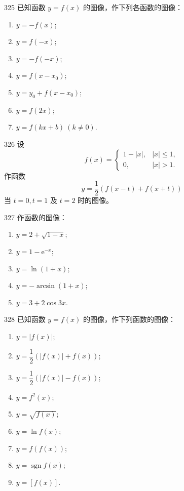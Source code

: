 \begin{prob}[L]{325}
已知函数 $y = f(x)$ 的图像，作下列各函数的图像：
\begin{enumerate}[label=(\alph*), itemsep=2pt, topsep=3pt]
  \item $y = -f(x)$;
  \item $y = f(-x)$;
  \item $y = -f(-x)$;
  \item $y = f(x - x_0)$;
  \item $y = y_0 + f(x - x_0)$;
  \item $y = f(2x)$;
  \item $y = f(kx + b) \ (k \neq 0)$.
\end{enumerate}
\end{prob}

\begin{prob}[M]{326}
设
\[
f(x) = \begin{cases}
1 - |x|, & |x| \leqslant 1, \\
0, & |x| > 1.
\end{cases}
\]
作函数
\[
y = \frac{1}{2}(f(x - t) + f(x + t))
\]
当 $t = 0, t = 1$ 及 $t = 2$ 时的图像。
\end{prob}

\begin{prob}[L]{327}
作函数的图像：
\begin{enumerate}[label=(\alph*), itemsep=2pt, topsep=3pt]
  \item $y = 2 + \sqrt{1 - x}$;
  \item $y = 1 - \mathrm{e}^{-x}$;
  \item $y = \ln(1 + x)$;
  \item $y = -\arcsin(1 + x)$;
  \item $y = 3 + 2\cos 3x$.
\end{enumerate}
\end{prob}

\begin{prob}[L]{328}
已知函数 $y = f(x)$ 的图像，作下列函数的图像：
\begin{enumerate}[label=(\alph*), itemsep=2pt, topsep=3pt]
  \item $y = |f(x)|$;
  \item $y = \dfrac{1}{2}(|f(x)| + f(x))$;
  \item $y = \dfrac{1}{2}(|f(x)| - f(x))$;
  \item $y = f^2(x)$;
  \item $y = \sqrt{f(x)}$;
  \item $y = \ln f(x)$;
  \item $y = f(f(x))$;
  \item $y = \operatorname{sgn} f(x)$;
  \item $y = [f(x)]$.
\end{enumerate}
\end{prob}

